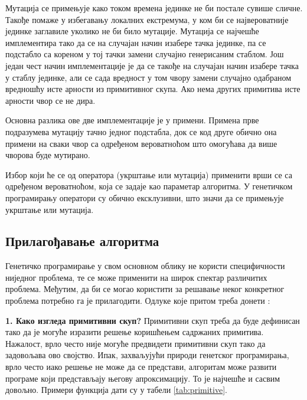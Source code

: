 \documentclass[a4paper]{article}
\begin{document}
Мутација се примењује како током времена јединке не би постале сувише сличне. Такође помаже у избегавању локалних екстремума, у ком би се највероватније јединке заглавиле уколико не би било мутације.
Мутација се најчешће имплементира тако да се на случајан начин изабере тачка јединке, па се подстабло са кореном у тој тачки замени случајно генерисаним стаблом. Још један чест начин имплементације је да се такође на случајан начин изабере тачка у стаблу јединке, али се сада вредност у том чвору замени случајно одабраном вредношћу исте арности из примитивног скупа. Ако нема других примитива исте арности чвор се не дира. 

Основна разлика ове две имплементације је у примени. Примена прве подразумева мутацију тачно једног подстабла, док се код друге обично она примени на сваки чвор са одређеном вероватноћом што омогућава да више чворова буде мутирано. \newline

Избор који ће се од оператора (укрштање или мутација) применити врши се са одређеном вероватноћом, која се задаје као параметар алгоритма. У генетичком програмирању оператори су обично ексклузивни, што значи да се примењује укрштање или мутација.

\subsection{Прилагођавање алгоритма}

Генетичко програмирање у свом основном облику не користи специфичности ниједног проблема, те се може применити на широк спектар различитих проблема. Међутим, да би се могао користити за решавање неког конкретног проблема потребно га је прилагодити. Одлуке које притом треба донети \cite{fieldGuidetoGP}:\newline

\textbf{1. Како изгледа примитивни скуп?}\newline
Примитивни скуп треба да буде дефинисан тако да је могуће изразити решење коришћењем садржаних примитива. Нажалост, врло често није могуће предвидети примитивни скуп тако да задовољава ово својство. Ипак, захваљујући природи генетског програмирања, врло често иако решење не може да се представи, алгоритам може развити програме који представљају његову апроксимацију. То је најчешће и сасвим довољно. Примери функција дати су у табели \ref{tab:primitive}. \newline
    
\end{document}
